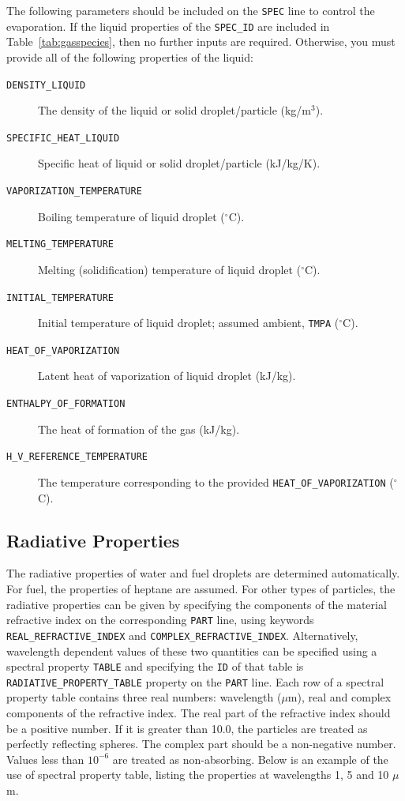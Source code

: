 \documentclass[11pt]{book}
\newcommand{\ct}{\tt\small}
\begin{document}
The following parameters should be
included on the {\ct SPEC} line to control the evaporation. If the liquid properties of the {\ct SPEC\_ID} are included in Table~\ref{tab:gasspecies},
then no further inputs are required. Otherwise, you must provide all of the following properties of the liquid:
\begin{description}
\item[{\ct DENSITY\_LIQUID}] The density of the liquid or solid droplet/particle (kg/m$^3$).
\item[{\ct SPECIFIC\_HEAT\_LIQUID}] Specific heat of liquid or solid droplet/particle (kJ/kg/K).
\item[{\ct VAPORIZATION\_TEMPERATURE}] Boiling temperature of liquid droplet ($^\circ$C).
\item[{\ct MELTING\_TEMPERATURE}] Melting (solidification) temperature of liquid droplet ($^\circ$C).
\item[{\ct INITIAL\_TEMPERATURE}] Initial temperature of liquid droplet; assumed ambient, {\ct TMPA} ($^\circ$C).
\item[{\ct HEAT\_OF\_VAPORIZATION}] Latent heat of vaporization of liquid droplet (kJ/kg).
\item[{\ct ENTHALPY\_OF\_FORMATION}] The heat of formation of the gas (kJ/kg).
\item[{\ct H\_V\_REFERENCE\_TEMPERATURE}] The temperature corresponding to the provided {\ct HEAT\_OF\_VAPORIZATION} ($^\circ$C).
\end{description}


\subsection{Radiative Properties}
\label{radiative_part_props}

The radiative properties of water and fuel droplets are determined automatically.
For fuel, the properties of heptane are assumed. For other types of particles, the
radiative properties can be given by specifying the components of the material refractive index on the corresponding {\ct PART} line, using keywords
{\ct REAL\_REFRACTIVE\_INDEX} and {\ct COMPLEX\_REFRACTIVE\_INDEX}. Alternatively, wavelength dependent values of these two quantities can be specified using
a spectral property {\ct TABLE} and specifying the {\ct ID} of that table is {\ct RADIATIVE\_PROPERTY\_TABLE} property on the {\ct PART} line.
Each row of a spectral property table contains three real numbers: wavelength ($\mu$m), real and complex components of the refractive index.
The real part of the refractive index should be a positive number. If it is greater than 10.0, the particles are treated as perfectly reflecting spheres.
The complex part should be a non-negative number. Values less than $10^{-6}$ are treated as non-absorbing.
Below is an example of the use of spectral property table, listing the properties at wavelengths 1, 5 and 10 $\mu$m.
\end{document}
